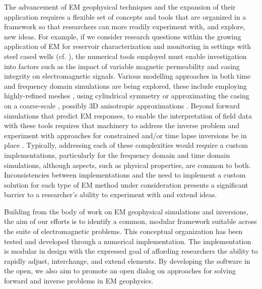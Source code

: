 \documentclass[preprint,review,3p,times,onecolumn,authoryear]{elsarticle}
\begin{document}
The advancement of EM geophysical techniques and the expansion of their
application requires a flexible set of concepts and tools that are organized
in a framework so that researchers can more readily experiment with, and
explore, new ideas. For example, if we consider research questions within the
growing application of EM for reservoir characterization and monitoring in
settings with steel cased wells (cf. \cite{Hoversten2015, Um2015, Commer2015,
cuevas2014, Hoversten2014, Pardo2013}), the numerical tools employed must
enable investigation into factors such as the impact of variable magnetic
permeability \citep{wuhabashy1994, Heagy2015} and casing integrity
\citep{brill2012} on electromagnetic signals. Various modelling approaches in
both time and frequency domain simulations are being explored, these include
employing highly-refined meshes \citep{Commer2015}, using cylindrical symmetry
\citep{Heagy2015} or approximating the casing on a coarse-scale
\citep{Um2015}, possibly 3D anisotropic approximations
\citep{CaudilloMata2014}. Beyond forward simulations that predict EM
responses, to enable the interpretation of field data with these tools
requires that machinery to address the inverse problem and experiment with
approaches for constrained and/or time lapse inversions be in place
\citep{Devriese2016, Marsala2015}. Typically, addressing each of these
complexities would require a custom implementations, particularly for the
frequency domain and time domain simulations, although aspects, such as
physical properties, are common to both. Inconsistencies between
implementations and the need to implement a custom solution for each type of
EM method under consideration presents a significant barrier to a researcher's
ability to experiment with and extend ideas.

Building from the body of work on EM geophysical simulations and inversions,
the aim of our efforts is to identify a common, modular framework suitable
across the suite of electromagnetic problems. This conceptual organization has
been tested and developed through a numerical implementation. The
implementation is modular in design with the expressed goal of affording
researchers the ability to rapidly adjust, interchange, and extend elements.
By developing the software in the open, we also aim to promote an open dialog
on approaches for solving forward and inverse problems in EM geophysics.
\end{document}
